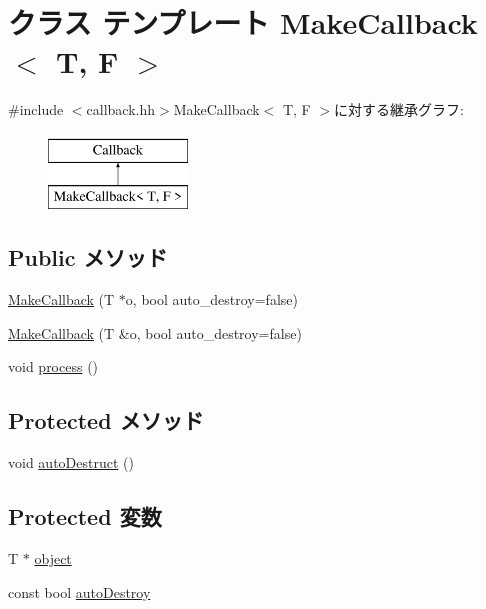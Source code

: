 \hypertarget{classMakeCallback}{
\section{クラス テンプレート MakeCallback$<$ T, F $>$}
\label{classMakeCallback}
}


{\ttfamily \#include $<$callback.hh$>$}MakeCallback$<$ T, F $>$に対する継承グラフ:\begin{figure}[H]
\begin{center}
\leavevmode
\includegraphics[height=2cm]{classMakeCallback}
\end{center}
\end{figure}
\subsection*{Public メソッド}
\begin{DoxyCompactItemize}
\item 
\hyperlink{classMakeCallback_a89db75a301f5973c77e3ecf451421bca}{MakeCallback} (T $\ast$o, bool auto\_\-destroy=false)
\item 
\hyperlink{classMakeCallback_a246ba82996f3fc041c535e56adc8a980}{MakeCallback} (T \&o, bool auto\_\-destroy=false)
\item 
void \hyperlink{classMakeCallback_a2e9c5136d19b1a95fc427e0852deab5c}{process} ()
\end{DoxyCompactItemize}
\subsection*{Protected メソッド}
\begin{DoxyCompactItemize}
\item 
void \hyperlink{classMakeCallback_ad57c93dcd984e5a596eb4a3f4236c93a}{autoDestruct} ()
\end{DoxyCompactItemize}
\subsection*{Protected 変数}
\begin{DoxyCompactItemize}
\item 
T $\ast$ \hyperlink{classMakeCallback_acd5a12b9b1a75e37fd605accfe038a03}{object}
\item 
const bool \hyperlink{classMakeCallback_aec33737f5034d003937b7b09ba215585}{autoDestroy}
\end{DoxyCompactItemize}


